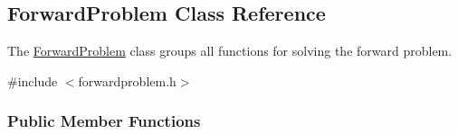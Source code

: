 \hypertarget{classamici_1_1_forward_problem}{}\subsection{Forward\+Problem Class Reference}
\label{classamici_1_1_forward_problem}


The \mbox{\hyperlink{classamici_1_1_forward_problem}{Forward\+Problem}} class groups all functions for solving the forward problem.  




{\ttfamily \#include $<$forwardproblem.\+h$>$}

\subsubsection*{Public Member Functions}

